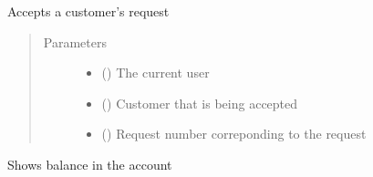 \documentclass[letterpaper,10pt,english]{sphinxmanual}
\begin{document}
\begin{fulllineitems}
\label{\detokenize{bank:bank.terminalFunctions.acceptRequest}}
Accepts a customer’s request
\begin{quote}\begin{description}
\item[{Parameters}] \leavevmode\begin{itemize}
\item {} 
 () \textendash{} The current user

\item {} 
 () \textendash{} Customer that is being accepted

\item {} 
 () \textendash{} Request number correponding to the request

\end{itemize}

\end{description}\end{quote}

\end{fulllineitems}


\begin{fulllineitems}
\label{\detokenize{bank:bank.terminalFunctions.balance}}
Shows balance in the account

\end{fulllineitems}


\begin{fulllineitems}
\label{\detokenize{bank:bank.terminalFunctions.clear}}
\end{fulllineitems}
\end{document}
